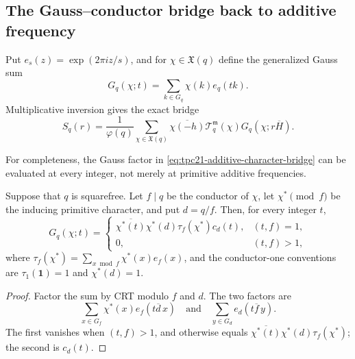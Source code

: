 \subsection{The Gauss--conductor bridge back to additive frequency}

Put \(e_s(z)=\exp(2\pi iz/s)\), and for
\(\chi\in\mathfrak X(q)\) define the generalized Gauss sum
\begin{equation}
 G_q(\chi;t)
 =\sum_{k\in G_q}\chi(k)e_q(tk).
 \label{eq:tpc21-generalized-Gauss}
\end{equation}
Multiplicative inversion gives the exact bridge
\begin{equation}
 \boxed{
 S_q(r)
 =\frac1{\varphi(q)}
  \sum_{\chi\in\mathfrak X(q)}
  \overline{\chi(-h)}
  \mathcal T_q^{\mathfrak m}(\chi)
  G_q(\chi;r\overline H).}
 \label{eq:tpc21-additive-character-bridge}
\end{equation}

For completeness, the Gauss factor in
\eqref{eq:tpc21-additive-character-bridge} can be evaluated at every
integer, not merely at primitive additive frequencies.

\begin{proposition}
\label{prop:tpc21-induced-Gauss}
Suppose that \(q\) is squarefree.  Let \(f\mid q\) be the conductor of
\(\chi\), let \(\chi^*\pmod f\) be the inducing primitive character,
and put \(d=q/f\).  Then, for every integer \(t\),
\begin{equation}
 G_q(\chi;t)
 =
 \begin{cases}
  \overline{\chi^*(t)}\chi^*(d)
  \tau_f(\chi^*)c_d(t),&(t,f)=1,\\
  0,&(t,f)>1,
 \end{cases}
 \label{eq:tpc21-induced-Gauss}
\end{equation}
where
\(\tau_f(\chi^*)=\sum_{x\bmod f}\chi^*(x)e_f(x)\), and the
conductor-one conventions are \(\tau_1(\mathbf1)=1\) and
\(\chi^*(d)=1\).
\end{proposition}

\begin{proof}
Factor the sum by CRT modulo \(f\) and \(d\).  The two factors are
\[
 \sum_{x\in G_f}\chi^*(x)e_f(t\overline d\,x)
 \quad\text{and}\quad
 \sum_{y\in G_d}e_d(t\overline f\,y).
\]
The first vanishes when \((t,f)>1\), and otherwise equals
\(\overline{\chi^*(t)}\chi^*(d)\tau_f(\chi^*)\); the second is
\(c_d(t)\).
\end{proof}

